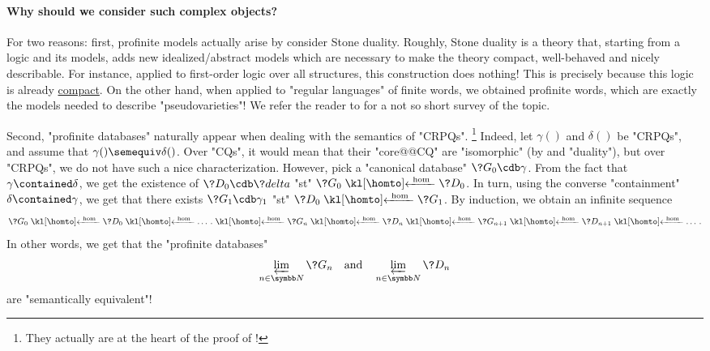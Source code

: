\paragraph{Why should we consider such complex objects?}
For two reasons: first, profinite models actually arise
by consider Stone duality. Roughly, Stone duality is a theory that,
starting from a logic and its models, adds new idealized/abstract models which
are necessary to make the theory compact, well-behaved and nicely describable.
For instance, applied to first-order logic over all structures,
this construction does nothing! This is precisely because this logic is already
\href{https://en.wikipedia.org/wiki/Compactness\_theorem}{compact}.
On the other hand, when applied to "regular languages" of finite words,
we obtained profinite words, which are exactly the models needed to describe
"pseudovarieties"! We refer the reader to \cite{GehrkeGool2024Topological}
for a not so short survey of the topic.

Second, "profinite databases" naturally appear when dealing with the semantics
of "CRPQs".%
\footnote{They actually are at the heart of
the proof of !}
Indeed, let $\gamma()$ and $\delta()$ be "CRPQs",
and assume that $\gamma() \semequiv \delta()$. Over "CQs", it would mean that
their "core@@CQ" are "isomorphic" (by  and "duality"),
but over "CRPQs", we do not have such a nice characterization.
However, pick a "canonical database" $\?G_0 \cdb \gamma$. From the
fact that $\gamma \contained \delta$, we get the existence of $\?D_0 \cdb \?delta$
"st" $\?G_0 \cohomto \?D_0$. In turn, using the converse "containment" $\delta \contained \gamma$,
we get that there exists $\?G_1 \cdb \gamma_1$ "st" $\?D_0 \cohomto \?G_1$. By induction,
we obtain an infinite sequence
\[
	\?G_0 \cohomto \?D_0 \cohomto \dotsc. \cohomto \?G_n \cohomto \?D_n \cohomto
	\?G_{n+1} \cohomto \?D_{n+1} \cohomto \dotsc.
\]
In other words, we get that the "profinite databases"
\[\varprojlim_{n\in\N} \?G_{n}
\quad\text{and}\quad
\varprojlim_{n\in\N} \?D_{n}\]
are "semantically equivalent"!

